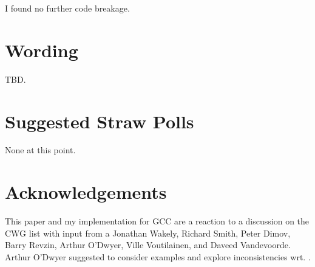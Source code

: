 I found no further code breakage.

\section{Wording}
TBD.

\section{Suggested Straw Polls}
None at this point.

\section{Acknowledgements}
This paper and my implementation for GCC are a reaction to a discussion on the CWG list 
with input from a Jonathan Wakely, Richard Smith, Peter Dimov, Barry Revzin, Arthur 
O'Dwyer, Ville Voutilainen, and Daveed Vandevoorde.
Arthur O'Dwyer suggested to consider  examples and explore 
inconsistencies wrt. .


